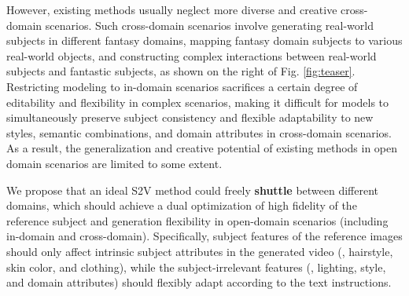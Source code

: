However, existing methods usually neglect more diverse and creative cross-domain scenarios. Such cross-domain scenarios involve generating real-world subjects in different fantasy domains, mapping fantasy domain subjects to various real-world objects, and constructing complex interactions between real-world subjects and fantastic subjects, as shown on the right of Fig. \ref{fig:teaser}. Restricting modeling to in-domain scenarios sacrifices a certain degree of editability and flexibility in complex scenarios, making it difficult for models to simultaneously preserve subject consistency and flexible adaptability to new styles, semantic combinations, and domain attributes in cross-domain scenarios. As a result, the generalization and creative potential of existing methods in open domain scenarios are limited to some extent.


We propose that an ideal S2V method could freely \textbf{shuttle} between different domains, which should achieve a dual optimization of high fidelity of the reference subject and generation flexibility in open-domain scenarios (including in-domain and cross-domain). Specifically, subject features of the reference images should only affect intrinsic subject attributes in the generated video (\eg, hairstyle, skin color, and clothing), while the subject-irrelevant features (\eg, lighting, style, and domain attributes) should flexibly adapt according to the text instructions.





